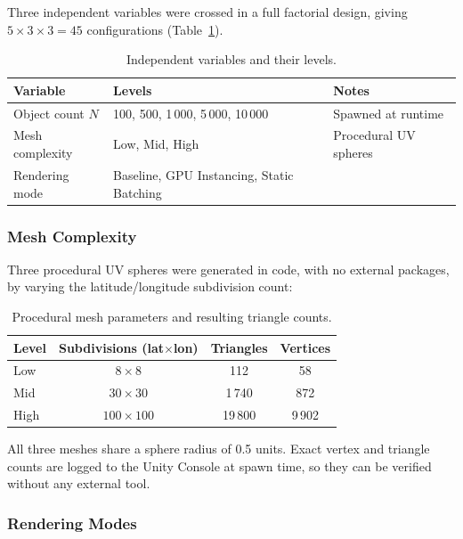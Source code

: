 \documentclass[11pt,a4paper]{article}
\begin{document}
Three independent variables were crossed in a full factorial design, giving
$5 \times 3 \times 3 = 45$ configurations (Table~\ref{tab:ivs}).

\begin{table}[H]
  \centering
  \caption{Independent variables and their levels.}
  \label{tab:ivs}
  \begin{tabular}{lll}
    \toprule
    Variable         & Levels                                    & Notes                 \\
    \midrule
    Object count $N$ & 100, 500, 1\,000, 5\,000, 10\,000         & Spawned at runtime    \\
    Mesh complexity  & Low, Mid, High                            & Procedural UV spheres \\
    Rendering mode   & Baseline, GPU Instancing, Static Batching &                       \\
    \bottomrule
  \end{tabular}
\end{table}

\subsubsection{Mesh Complexity}

Three procedural UV spheres were generated in code, with no external packages, by
varying the latitude/longitude subdivision count:

\begin{table}[H]
  \centering
  \caption{Procedural mesh parameters and resulting triangle counts.}
  \label{tab:meshes}
  \begin{tabular}{lccc}
    \toprule
    Level & Subdivisions (lat$\times$lon) & Triangles & Vertices \\
    \midrule
    Low   & $8\times8$                    & 112       & 58       \\
    Mid   & $30\times30$                  & 1\,740    & 872      \\
    High  & $100\times100$                & 19\,800   & 9\,902   \\
    \bottomrule
  \end{tabular}
\end{table}

All three meshes share a sphere radius of 0.5 units. Exact vertex and triangle counts
are logged to the Unity Console at spawn time, so they can be verified without any
external tool.

\subsubsection{Rendering Modes}
\end{document}

